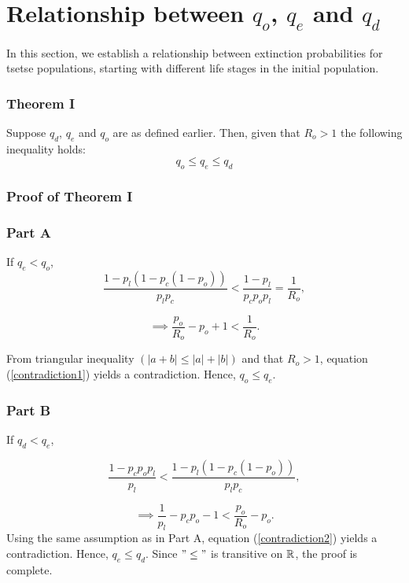 \documentclass[smallextended]{svjour3}
\begin{document}
\section{Relationship between $q_{o}$, $q_{e}$ and $q_{d}$}

In this section, we establish a relationship between extinction probabilities for tsetse populations, starting with different life stages in the initial population. 

\subsubsection*{Theorem I}
Suppose $q_{d}$, $q_{e}$ and $q_{o}$ are as defined earlier. Then,  given that $R_{o}>1$ the following inequality holds:
\begin{equation}
\label{Aretsetsetheorem}
q_{o}\leq q_{e} \leq q_{d}
\end{equation}

\subsubsection{Proof of Theorem I}
\subsubsection{Part A}
If  $q_{e} < q_{o}$, %
$$ \frac{1- p_{l}(1 -p_{c}(1- p_{o}))}{p_{l}p_{c}} < \frac{1-p_{l}}{p_{c}p_{o}p_{l}} = \frac{1}{R_{o}}, $$

\begin{equation}
\label{contradiction1}
\implies       \frac{p_{o}}{R_{o}} - p_{o} + 1 < \frac{1}{R_{o}}. 
\end{equation}

From triangular inequality $( |a + b| \leq |a| + |b|)$ and  that $R_{o} > 1$, equation (\ref{contradiction1}) yields a contradiction. Hence, $q_{o} \leq q_{e}$. 
\subsubsection{Part B}
If $q_{d} < q_{e}$,

$$  \frac{1-p_{c}p_{o}p_{l}}{p_{l}}  < \frac{1- p_{l}(1 -p_{c}(1- p_{o}))}{p_{l}p_{c}},  $$

\begin{equation}
\label{contradiction2}
\implies  \frac{1}{p_{l}} - p_{c}p_{o} - 1 <     \frac{p_{o}}{R_{o}} - p_{o}.
\end{equation}
Using the same assumption as in Part A, equation (\ref{contradiction2}) yields a contradiction. Hence, $q_{e} \leq q_{d}$. Since $"\leq"$ is transitive on ${\Bbb R}$, the proof is complete.
\end{document}

